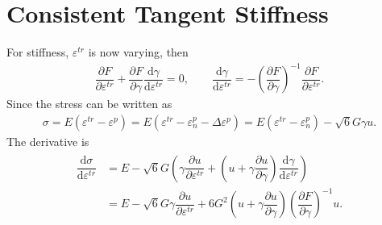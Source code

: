 \documentclass[a4paper,10pt,fleqn]{article}
\newcommand*{\md}[1]{\mathrm{d}#1}
\newcommand*{\pfrac}[2]{\dfrac{\partial#1}{\partial#2}}
\newcommand*{\ddfrac}[2]{\dfrac{\md#1}{\md#2}}
\begin{document}
\section{Consistent Tangent Stiffness}
For stiffness, $\varepsilon^{tr}$ is now varying, then
\begin{gather}
\pfrac{F}{\varepsilon^{tr}}+\pfrac{F}{\gamma}\ddfrac{\gamma}{\varepsilon^{tr}}=0,\qquad\ddfrac{\gamma}{\varepsilon^{tr}}=-\left(\pfrac{F}{\gamma}\right)^{-1}\pfrac{F}{\varepsilon^{tr}}.
\end{gather}
Since the stress can be written as
\begin{gather}
\sigma=E(\varepsilon^{tr}-\varepsilon^p)=E(\varepsilon^{tr}-\varepsilon^p_n-\Delta\varepsilon^p)=E(\varepsilon^{tr}-\varepsilon^p_n)-\sqrt{6}G\gamma{}u.
\end{gather}
The derivative is
\begin{gather}
\begin{split}
\ddfrac{\sigma}{\varepsilon^{tr}}&=E-\sqrt{6}G\left(\gamma\pfrac{u}{\varepsilon^{tr}}+\left(u+\gamma\pfrac{u}{\gamma}\right)\ddfrac{\gamma}{\varepsilon^{tr}}\right)\\
&=E-\sqrt{6}G\gamma\pfrac{u}{\varepsilon^{tr}}+6G^2\left(u+\gamma\pfrac{u}{\gamma}\right)\left(\pfrac{F}{\gamma}\right)^{-1}u.
\end{split}
\end{gather}
\end{document}
